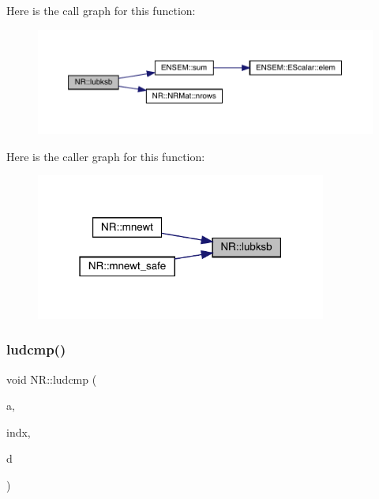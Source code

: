 Here is the call graph for this function\+:
\nopagebreak
\begin{figure}[H]
\begin{center}
\leavevmode
\includegraphics[width=350pt]{da/d46/namespaceNR_a1455a894979c7f2eaf3ef611a611cc42_cgraph}
\end{center}
\end{figure}
Here is the caller graph for this function\+:
\nopagebreak
\begin{figure}[H]
\begin{center}
\leavevmode
\includegraphics[width=271pt]{da/d46/namespaceNR_a1455a894979c7f2eaf3ef611a611cc42_icgraph}
\end{center}
\end{figure}
\mbox{\label{namespaceNR_a71e8f8aa20cd167f6379653f60ccaa1a}} 
\subsubsection{\texorpdfstring{ludcmp()}{ludcmp()}}
{\footnotesize\ttfamily void N\+R\+::ludcmp (\begin{DoxyParamCaption}\item[{\mbox{\hyperlink{namespaceNR_ad1513aa4697878ed3bff0b8b3c9dd910}{Mat\+\_\+\+I\+O\+\_\+\+DP}} \&}]{a,  }\item[{\mbox{\hyperlink{namespaceNR_ade2338f6d53b7da3dd6d1c04804541f2}{Vec\+\_\+\+O\+\_\+\+I\+NT}} \&}]{indx,  }\item[{\mbox{\hyperlink{namespaceNR_af6ff762dd605ff477b8e52387253a02a}{DP}} \&}]{d }\end{DoxyParamCaption})}


